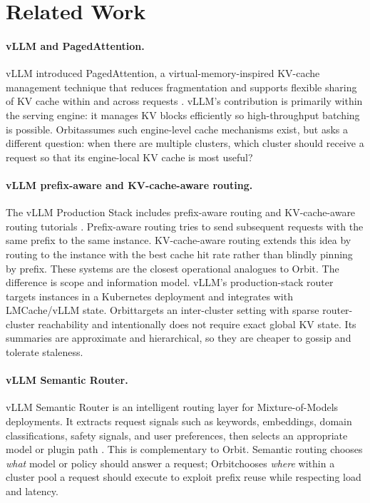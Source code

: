 \documentclass[10pt,twocolumn]{article}
\newcommand{\sys}{Orbit}
\begin{document}
\section{Related Work}

\paragraph{vLLM and PagedAttention.}
vLLM introduced PagedAttention, a virtual-memory-inspired KV-cache management technique that reduces fragmentation and supports flexible sharing of KV cache within and across requests \cite{kwon2023vllm}. vLLM's contribution is primarily within the serving engine: it manages KV blocks efficiently so high-throughput batching is possible. \sys assumes such engine-level cache mechanisms exist, but asks a different question: when there are multiple clusters, which cluster should receive a request so that its engine-local KV cache is most useful?

\paragraph{vLLM prefix-aware and KV-cache-aware routing.}
The vLLM Production Stack includes prefix-aware routing and KV-cache-aware routing tutorials \cite{vllmprefix,vllmkvaware}. Prefix-aware routing tries to send subsequent requests with the same prefix to the same instance. KV-cache-aware routing extends this idea by routing to the instance with the best cache hit rate rather than blindly pinning by prefix. These systems are the closest operational analogues to \sys. The difference is scope and information model. vLLM's production-stack router targets instances in a Kubernetes deployment and integrates with LMCache/vLLM state. \sys targets an inter-cluster setting with sparse router-cluster reachability and intentionally does not require exact global KV state. Its summaries are approximate and hierarchical, so they are cheaper to gossip and tolerate staleness.

\paragraph{vLLM Semantic Router.}
vLLM Semantic Router is an intelligent routing layer for Mixture-of-Models deployments. It extracts request signals such as keywords, embeddings, domain classifications, safety signals, and user preferences, then selects an appropriate model or plugin path \cite{vllmsemantic,vllmsemanticprod}. This is complementary to \sys. Semantic routing chooses \emph{what} model or policy should answer a request; \sys chooses \emph{where} within a cluster pool a request should execute to exploit prefix reuse while respecting load and latency.
\end{document}
